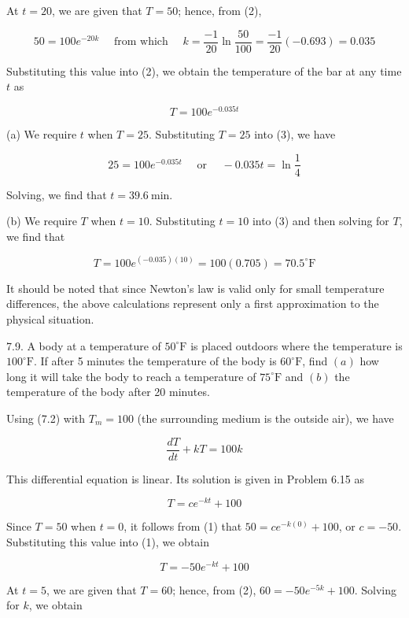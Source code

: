 \documentclass[10pt]{article}
\begin{document}
At $t=20$, we are given that $T=50$; hence, from (2),

$$
50=100 e^{-20 k} \quad \text { from which } \quad k=\frac{-1}{20} \ln \frac{50}{100}=\frac{-1}{20}(-0.693)=0.035
$$

Substituting this value into (2), we obtain the temperature of the bar at any time $t$ as


\begin{equation*}
T=100 e^{-0.035 t} \tag{3}
\end{equation*}


(a) We require $t$ when $T=25$. Substituting $T=25$ into (3), we have

$$
25=100 e^{-0.035 t} \quad \text { or } \quad-0.035 t=\ln \frac{1}{4}
$$

Solving, we find that $t=39.6 \mathrm{~min}$.

(b) We require $T$ when $t=10$. Substituting $t=10$ into (3) and then solving for $T$, we find that

$$
T=100 e^{(-0.035)(10)}=100(0.705)=70.5^{\circ} \mathrm{F}
$$

It should be noted that since Newton's law is valid only for small temperature differences, the above calculations represent only a first approximation to the physical situation.

7.9. A body at a temperature of $50^{\circ} \mathrm{F}$ is placed outdoors where the temperature is $100^{\circ} \mathrm{F}$. If after 5 minutes the temperature of the body is $60^{\circ} \mathrm{F}$, find $(a)$ how long it will take the body to reach a temperature of $75^{\circ} \mathrm{F}$ and $(b)$ the temperature of the body after 20 minutes.

Using (7.2) with $T_{m}=100$ (the surrounding medium is the outside air), we have

$$
\frac{d T}{d t}+k T=100 k
$$

This differential equation is linear. Its solution is given in Problem 6.15 as


\begin{equation*}
T=c e^{-k t}+100 \tag{1}
\end{equation*}


Since $T=50$ when $t=0$, it follows from (1) that $50=c e^{-k(0)}+100$, or $c=-50$. Substituting this value into (1), we obtain


\begin{equation*}
T=-50 e^{-k t}+100 \tag{2}
\end{equation*}


At $t=5$, we are given that $T=60$; hence, from (2), $60=-50 e^{-5 k}+100$. Solving for $k$, we obtain
\end{document}
